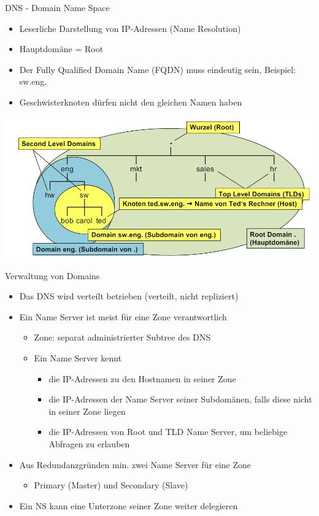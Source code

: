 \begin{definition}{DNS - Domain Name Space}
    \begin{itemize}
        \item Leserliche Darstellung von IP-Adressen (Name Resolution)
        \item Hauptdomäne = Root
        \item Der Fully Qualified Domain Name (FQDN) muss eindeutig sein, Beispiel: sw.eng.
        \item Geschwisterknoten dürfen nicht den gleichen Namen haben
    \end{itemize}
    \includegraphics[width=1\linewidth]{images/dns_explained.png}
\end{definition}

\begin{concept}{Verwaltung von Domains}
    \begin{itemize}
        \item Das DNS wird verteilt betrieben (verteilt, nicht repliziert)
        \item Ein Name Server ist meist für eine Zone verantwortlich
        \begin{itemize}
            \item Zone: separat administrierter Subtree des DNS
            \item Ein Name Server kennt
            \begin{itemize}
                \item die IP-Adressen zu den Hostnamen in seiner Zone
                \item die IP-Adressen der Name Server seiner Subdomänen, falls diese nicht in seiner Zone liegen
                \item die IP-Adressen von Root und TLD Name Server, um beliebige Abfragen zu erlauben
            \end{itemize}
        \end{itemize}
        \item Aus Redundanzgründen min. zwei Name Server für eine Zone
        \begin{itemize}
            \item Primary (Master) und Secondary (Slave) 
        \end{itemize}
        \item Ein NS kann eine Unterzone seiner Zone weiter delegieren
    \end{itemize}
\end{concept}


